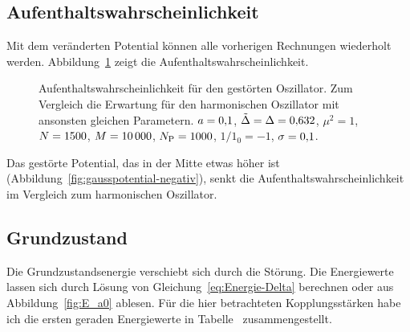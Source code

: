 \subsection{Aufenthaltswahrscheinlichkeit}

Mit dem veränderten Potential können alle vorherigen Rechnungen wiederholt
werden. Abbildung~\ref{fig:histogram_gauss} zeigt die
Aufenthaltswahrscheinlichkeit.

\begin{figure}[htbp]
    \centering
    \caption{%
        Aufenthaltswahrscheinlichkeit für den gestörten Oszillator. Zum
        Vergleich die Erwartung für den harmonischen Oszillator mit ansonsten
        gleichen Parametern. $a = \num{0.1}$, $\tilde \Delta =
        \Delta = \num{0.632}$, $\mu^2 = \num{1}$, $N = \num{1500}$,
        $M = \num{10000}$, $N_\text P = \num{1000}$, $1/1_0 =
        \num{-1}$, $\sigma = \num{0.1}$.
    }
    \label{fig:histogram_gauss}
\end{figure}

Das gestörte Potential, das in der Mitte etwas höher ist
(Abbildung~\ref{fig:gausspotential-negativ}), senkt die
Aufenthaltswahrscheinlichkeit im Vergleich zum harmonischen Oszillator.

\subsection{Grundzustand}

Die Grundzustandsenergie verschiebt sich durch die Störung. Die Energiewerte
lassen sich durch Lösung von Gleichung~\eqref{eq:Energie-Delta} berechnen oder
aus Abbildung~\ref{fig:E_a0} ablesen. Für die hier betrachteten
Kopplungsstärken habe ich die ersten geraden Energiewerte in
Tabelle~\label{tab:E_a0} zusammengestellt.

